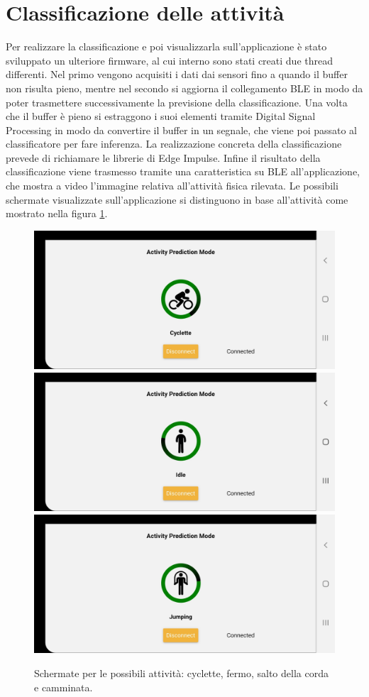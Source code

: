 \section{Classificazione delle attività}

Per realizzare la classificazione e poi visualizzarla sull'applicazione è stato sviluppato un ulteriore firmware, al cui interno sono stati creati due thread differenti. Nel primo vengono acquisiti i dati dai sensori fino a quando il buffer non risulta pieno, mentre nel secondo si aggiorna il collegamento BLE in modo da poter trasmettere successivamente la previsione della classificazione. Una volta che il buffer è pieno si estraggono i suoi elementi tramite Digital Signal Processing in modo da convertire il buffer in un segnale, che viene poi passato al classificatore per fare inferenza. La realizzazione concreta della classificazione prevede di richiamare le librerie di Edge Impulse. Infine il risultato della classificazione viene trasmesso tramite una caratteristica su BLE all'applicazione, che mostra a video l'immagine relativa all'attività fisica rilevata. Le possibili schermate visualizzate sull'applicazione si distinguono in base all'attività come mostrato nella figura \ref{fig:attivitafisica}.

\begin{figure}[tbh]
	\centering
	\includegraphics[width=0.4\linewidth]{./ImageFiles/cyclette}
	\includegraphics[width=0.4\linewidth]{./ImageFiles/idle}
	\includegraphics[width=0.4\linewidth]{./ImageFiles/jumping}
	\caption{Schermate per le possibili attività: cyclette, fermo, salto della corda e camminata.}
	\label{fig:attivitafisica}
\end{figure}

